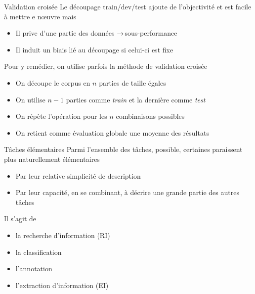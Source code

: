 \documentclass[hyperref={unicode}, xcolor={svgnames}]{beamer}
\begin{document}
\begin{frame}[fragile]{Validation croisée}
    Le découpage train/dev/test ajoute de l'objectivité et est facile à mettre e nœuvre mais
    \begin{itemize}
        \item Il prive d'une partie des données → sous-performance
        \item Il induit un biais lié au découpage si celui-ci est fixe
    \end{itemize}

    Pour y remédier, on utilise parfois la méthode de validation croisée
    \begin{itemize}
        \item<1-> On découpe le corpus en $n$ parties de taille égales
        \item<2-> On utilise $n-1$ parties comme \textcolor{highlight0}{\textit{train}} et la dernière comme \textcolor{highlight6}{\textit{test}}
        \item<3-> On répète l'opération pour les $n$ combinaisons possibles
        \item<12-> On retient comme évaluation globale une moyenne des résultats
    \end{itemize}
    \begin{center}
    \end{center}
\end{frame}

\begin{frame}{Tâches élémentaires}
    Parmi l'ensemble des tâches, possible, certaines paraissent plus naturellement élémentaires
    \begin{itemize}
        \item Par leur relative simplicité de description
        \item Par leur capacité, en se combinant, à décrire une grande partie des autres tâches
    \end{itemize}

    Il s'agit de
        \begin{itemize}
            \item la recherche d'information (RI)
            \item la classification
            \item l'annotation
            \item l'extraction d'information (EI)
        \end{itemize}
\end{frame}
\end{document}
